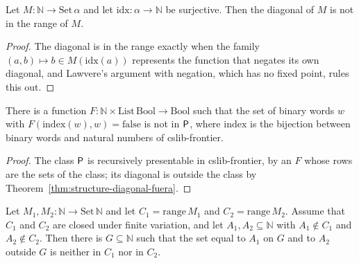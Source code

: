 \begin{theorem}
  \label{thm:structure-diagonal-fuera}
  \leanok
  Let $M : \mathbb{N} \to \mathrm{Set}\,\alpha$ and let $\mathrm{idx} : \alpha \to \mathbb{N}$ be
  surjective. Then the diagonal of $M$ is not in the range of $M$.
  \own{}
\end{theorem}

\begin{proof}
  \leanok
  The diagonal is in the range exactly when the family $(a, b) \mapsto b \in M(\mathrm{idx}(a))$
  represents the function that negates its own diagonal, and Lawvere's argument with negation, which
  has no fixed point, rules this out.
\end{proof}

\begin{theorem}
  \label{thm:structure-diagonal-fuera-p}
  \leanok
  There is a function $F : \mathbb{N} \times \mathrm{List}\,\mathrm{Bool} \to \mathrm{Bool}$ such that the set
  of binary words $w$ with $F(\mathrm{index}(w), w) = \mathrm{false}$ is not in $\mathsf{P}$, where
  $\mathrm{index}$ is the bijection between binary words and natural numbers of cslib-frontier.
  \own{}
\end{theorem}

\begin{proof}
  \leanok
  The class $\mathsf{P}$ is recursively presentable in cslib-frontier, by an $F$ whose rows are the sets of
  the class; its diagonal is outside the class by Theorem~\ref{thm:structure-diagonal-fuera}.
\end{proof}

\begin{theorem}
  \label{thm:structure-schoning-abstracto}
  \leanok
  Let $M_1, M_2 : \mathbb{N} \to \mathrm{Set}\,\mathbb{N}$ and let $C_1 = \mathrm{range}\,M_1$ and $C_2 =
  \mathrm{range}\,M_2$. Assume that $C_1$ and $C_2$ are closed under finite variation, and let $A_1,
  A_2 \subseteq \mathbb{N}$ with $A_1 \notin C_1$ and $A_2 \notin C_2$. Then there is $G \subseteq
  \mathbb{N}$ such that the set equal to $A_1$ on $G$ and to $A_2$ outside $G$ is neither in $C_1$ nor
  in $C_2$.
\end{theorem}

